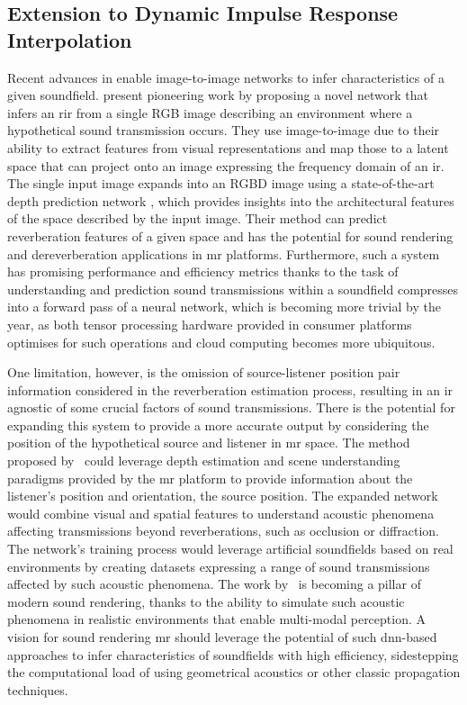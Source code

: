 \subsection{Extension to Dynamic Impulse Response Interpolation}\label{sec:dynamic-rir-expansion}
Recent advances in  enable image-to-image networks to infer characteristics of a given soundfield. \cite{Singh_2021_ICCV} present pioneering work by proposing a novel network that infers an \acrshort{rir} from a single RGB image describing an environment where a hypothetical sound transmission occurs. They use image-to-image  due to their ability to extract features from visual representations and map those to a latent space that can project onto an image expressing the frequency domain of an \acrshort{ir}. The single input image expands into an RGBD image using a state-of-the-art depth prediction network \citep{bauer2021nvs}, which provides insights into the architectural features of the space described by the input image. Their method can predict reverberation features of a given space and has the potential for sound rendering and dereverberation applications in \acrshort{mr} platforms. Furthermore, such a system has promising performance and efficiency metrics thanks to the task of understanding and prediction sound transmissions within a soundfield compresses into a forward pass of a neural network, which is becoming more trivial by the year, as both tensor processing hardware provided in consumer platforms optimises for such operations and cloud computing becomes more ubiquitous.\par
One limitation, however, is the omission of source-listener position pair information considered in the reverberation estimation process, resulting in an \acrshort{ir} agnostic of some crucial factors of sound transmissions. There is the potential for expanding this system to provide a more accurate output by considering the position of the hypothetical source and listener in \acrshort{mr} space. The method proposed by~\cite{Singh_2021_ICCV} could leverage depth estimation and scene understanding paradigms provided by the \acrshort{mr} platform to provide information about the listener's position and orientation, the source position. The expanded network would combine visual and spatial features to understand acoustic phenomena affecting transmissions beyond reverberations, such as occlusion or diffraction. The network's training process would leverage artificial soundfields based on real environments by creating datasets expressing a range of sound transmissions affected by such acoustic phenomena. The work by~\cite{chen2022soundspaces} is becoming a pillar of modern sound rendering, thanks to the ability to simulate such acoustic phenomena in realistic environments that enable multi-modal perception. A vision for sound rendering \acrshort{mr} should leverage the potential of such \acrshort{dnn}-based approaches to infer characteristics of soundfields with high efficiency, sidestepping the computational load of using geometrical acoustics or other classic propagation techniques.\par

